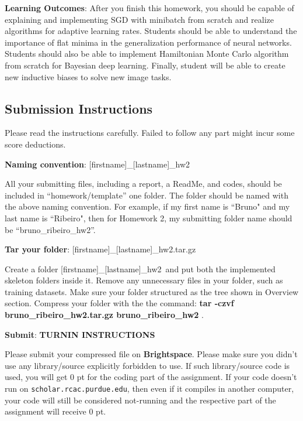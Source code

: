 \documentclass{article}
\newcommand{\homeworknumber}{2}
\begin{document}
\hfill

\noindent \textbf{Learning Outcomes}: After you finish this homework, you should be capable of explaining and implementing SGD with minibatch from scratch and realize algorithms for adaptive learning rates. Students should be able to understand the importance of flat minima in the generalization performance of neural networks.
Students should also be able to implement Hamiltonian Monte Carlo algorithm from scratch for Bayesian deep learning.
Finally, student will be able to create new inductive biases to solve new image tasks.

\hfill

\newpage

\newpage


\newpage
\subsection*{Submission Instructions}

Please read the instructions carefully. Failed to follow any part might incur some score deductions.

\hfill

\noindent \textbf{Naming convention}: [firstname]\_[lastname]\_hw\homeworknumber

All your submitting files, including a report, a ReadMe, and codes, should be included in ``homework/template'' one folder. The folder should be named with the above naming convention. For example, if my first name is ``Bruno" and my last name is ``Ribeiro", then for Homework \homeworknumber, my submitting folder name should be ``bruno\_ribeiro\_hw\homeworknumber''.


\hfill

\noindent \textbf{Tar your folder}: [firstname]\_[lastname]\_hw\homeworknumber.tar.gz

Create a folder [firstname]\_[lastname]\_hw\homeworknumber\ 
 and put both the implemented skeleton folders inside it. Remove any unnecessary files in your folder, such as training datasets. Make sure your folder structured as the tree shown in Overview section. Compress your folder with the the command: \textbf{tar -czvf bruno\_ribeiro\_hw\homeworknumber.tar.gz bruno\_ribeiro\_hw\homeworknumber} .


\hfill

\noindent \textbf{Submit}: 
{\bf TURNIN INSTRUCTIONS}

Please submit your compressed file on \textbf{Brightspace}.
Please make sure you didn’t use any library/source explicitly forbidden to use. If such library/source code is used, you will get 0 pt for the coding part of the assignment. If your code doesn’t run on \texttt{scholar.rcac.purdue.edu}, then even if it compiles in another computer, your code will still be considered not-running and the respective part of the assignment will receive 0 pt.
\end{document}
